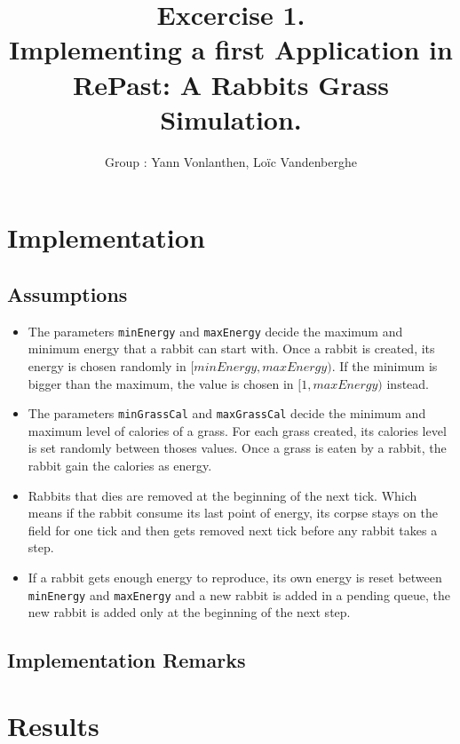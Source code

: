 \documentclass[11pt]{article}
\title{\bf Excercise 1.\\ Implementing a first Application in RePast: A Rabbits Grass Simulation.}
\author{Group \textnumero46: Yann Vonlanthen, Lo\"ic Vandenberghe}
\begin{document}
\maketitle

\section{Implementation}

\subsection{Assumptions}
\begin{itemize}
\item The parameters \lstinline!minEnergy! and \lstinline!maxEnergy! decide the maximum and minimum energy that a rabbit can start with. Once a rabbit is created, its energy is chosen randomly in $[minEnergy, maxEnergy)$. If the minimum is bigger than the maximum, the value is chosen in $[1, maxEnergy)$ instead.
\item The parameters \lstinline!minGrassCal! and \lstinline!maxGrassCal! decide the minimum and maximum level of calories of a grass. For each grass created, its calories level is set randomly between thoses values. Once a grass is eaten by a rabbit, the rabbit gain the calories as energy.
 \item Rabbits that dies are removed at the beginning of the next tick. Which means if the rabbit consume its last point of energy, its corpse stays on the field for one tick and then gets removed next tick before any rabbit takes a step.
 \item If a rabbit gets enough energy to reproduce, its own energy is reset between \lstinline!minEnergy! and \lstinline!maxEnergy! and a new rabbit is added in a pending queue, the new rabbit is added only at the beginning of the next step.
\end{itemize}


\subsection{Implementation Remarks}

\section{Results}
\end{document}
